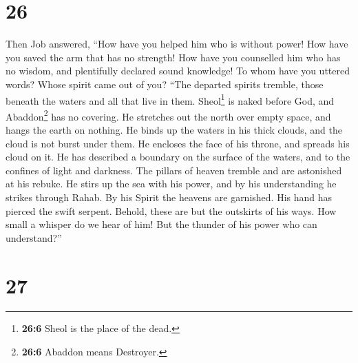\hypertarget{section-19}{%
\section{26}\label{section-19}}

 Then Job answered,  ``How have you helped
him who is without power! How have you saved the arm that has no
strength!  How have you counselled him who has no wisdom,
and plentifully declared sound knowledge!  To whom have
you uttered words? Whose spirit came out of you?  ``The
departed spirits tremble, those beneath the waters and all that live in
them.  Sheol\footnote{\textbf{26:6} Sheol is the place of
  the dead.} is naked before God, and Abaddon\footnote{\textbf{26:6}
  Abaddon means Destroyer.} has no covering.  He stretches
out the north over empty space, and hangs the earth on nothing.
 He binds up the waters in his thick clouds, and the cloud
is not burst under them.  He encloses the face of his
throne, and spreads his cloud on it.  He has described a
boundary on the surface of the waters, and to the confines of light and
darkness.  The pillars of heaven tremble and are
astonished at his rebuke.  He stirs up the sea with his
power, and by his understanding he strikes through Rahab.
 By his Spirit the heavens are garnished. His hand has
pierced the swift serpent.  Behold, these are but the
outskirts of his ways. How small a whisper do we hear of him! But the
thunder of his power who can understand?''

\hypertarget{section-20}{%
\section{27}\label{section-20}}

